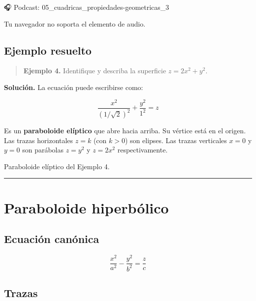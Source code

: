 \documentclass[
]{book}
\begin{document}
🎧 Podcast: 05\_cuadricas\_propiedades-geometricas\_3

Tu navegador no soporta el elemento de audio.

\subsection{Ejemplo resuelto}\label{ejemplo-resuelto-19}

\begin{quote}
\textbf{Ejemplo 4.} Identifique y describa la superficie \(z = 2x^2 + y^2\).
\end{quote}

\textbf{Solución.} La ecuación puede escribirse como:

\[
\frac{x^2}{(1/\sqrt{2})^2} + \frac{y^2}{1^2} = z
\]

Es un \textbf{paraboloide elíptico} que abre hacia arriba. Su vértice está en el origen. Las trazas horizontales \(z = k\) (con \(k > 0\)) son elipses. Las trazas verticales \(x = 0\) y \(y = 0\) son parábolas \(z = y^2\) y \(z = 2x^2\) respectivamente.

\label{fig:paraboloide-eliptico-ejemplo}Paraboloide elíptico del Ejemplo 4.

\begin{center}\rule{0.5\linewidth}{0.5pt}\end{center}

\section{Paraboloide hiperbólico}\label{paraboloide-hiperbuxf3lico}

\subsection{Ecuación canónica}\label{ecuaciuxf3n-canuxf3nica-4}

\[
\frac{x^2}{a^2} - \frac{y^2}{b^2} = \frac{z}{c}
\]

\subsection{Trazas}\label{trazas-4}
\end{document}
